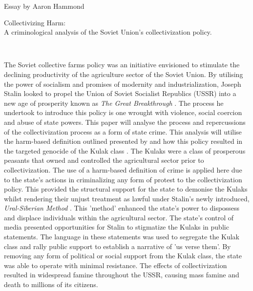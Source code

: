 \documentclass[12pt, a4paper,]{scrartcl}
\begin{document}
\vspace{-2em}
\begin{flushleft}{\footnotesize{}
Essay by Aaron Hammond
}
\end{flushleft}

\begin{center}
\vspace{1cm}
\huge Collectivizing Harm:\\[.2cm]
\large A criminological analysis of the Soviet Union's collectivization policy. 
\end{center}

\hrulefill\hspace{0.2cm}\color{antiqueruby} \floweroneleft\floweroneright \color{black}\hspace{0.2cm} \hrulefill\\
\vspace{0.2cm}


The Soviet collective farms policy was an initiative envisioned to stimulate the declining productivity of the agriculture sector of the Soviet Union. By utilising the power of socialism and promises of modernity and industrialization, Joseph Stalin looked to propel the Union of Soviet Socialist Republics (USSR) into a new age of prosperity known as \textit{The Great Breakthrough} \cite{Hughes1991}. The process he undertook to introduce this policy is one wrought with violence, social coercion and abuse of state powers. This paper will analyse the process and repercussions of the collectivization process as a form of state crime. This analysis will utilise the harm-based definition outlined presented by \cite{STEVETOMBSandDAVEWHYTE2002} and how this policy resulted in the targeted genocide of the Kulak class \cite{Meierhenrich}. The Kulaks were a class of prosperous peasants that owned and controlled the agricultural sector prior to collectivization. The use of a harm-based definition of crime is applied here due to the state's actions in criminalizing any form of protest to the collectivization policy. This provided the structural support for the state to demonise the Kulaks whilst rendering their unjust treatment as lawful under Stalin's newly introduced, \textit{Ural-Siberian Method} \cite{Viola2005}. This 'method' enhanced the state's power to dispossess and displace individuals within the agricultural sector. The state's control of media presented opportunities for Stalin to stigmatize the Kulaks in public statements. The language in these statements was used to segregate the Kulak class and rally public support to establish a narrative of 'us verse them'. By removing any form of political or social support from the Kulak class, the state was able to operate with minimal resistance. The effects of collectivization resulted in widespread famine throughout the USSR, causing mass famine and death to millions of its citizens.\par
\end{document}
